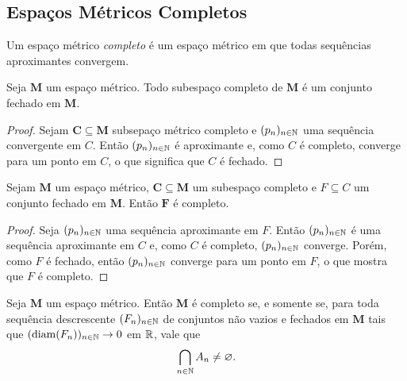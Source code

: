 \subsection{Espaços Métricos Completos}

\begin{defi}
Um espaço métrico \emph{completo} é um espaço métrico em que todas sequências aproximantes convergem.
\end{defi}

\begin{prop}
Seja $\bm M$ um espaço métrico. Todo subespaço completo de $\bm M$ é um conjunto fechado em $\bm M$.
\end{prop}
\begin{proof}
Sejam $\bm C \subseteq \bm M$ subsepaço métrico completo e $(p_n)_{n \in \mathbb{N}}$ uma sequência convergente em $C$. Então $(p_n)_{n \in \mathbb{N}}$ é aproximante e, como $C$ é completo, converge para um ponto em $C$, o que significa que $C$ é fechado.
\end{proof}

\begin{prop}
Sejam $\bm M$ um espaço métrico, $\bm C \subseteq \bm M$ um subespaço completo e $F \subseteq C$ um conjunto fechado em $\bm M$. Então $\bm F$ é completo.
\end{prop}
\begin{proof}
Seja $(p_n)_{n \in \mathbb{N}}$ uma sequência aproximante em $F$. Então $(p_n)_{n \in \mathbb{N}}$ é uma sequência aproximante em $C$ e, como $C$ é completo, $(p_n)_{n \in \mathbb{N}}$ converge. Porém, como $F$ é fechado, então $(p_n)_{n \in \mathbb{N}}$ converge para um ponto em $F$, o que mostra que $F$ é completo.
\end{proof}

\begin{teo}
Seja $\bm M$ um espaço métrico. Então $\bm M$ é completo se, e somente se, para toda sequência descrescente $(F_n)_{n \in \mathbb{N}}$ de conjuntos não vazios e fechados em $\bm M$ tais que $(\operatorname{diam}(F_n))_{n \in \mathbb{N}} \rightarrow 0$ em $\mathbb{R}$, vale que
	\begin{equation*}
	\bigcap_{n \in \mathbb{N}} A_n \neq \varnothing.
	\end{equation*}
\end{teo}

